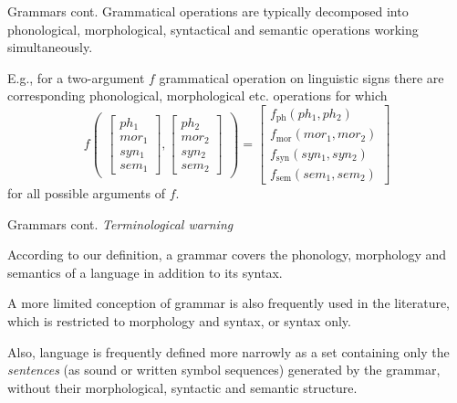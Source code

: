 \documentclass[style=upen, size=14pt]{powerdot}
\begin{document}
\begin{slide}[toc=]{Grammars cont.}
  Grammatical operations are typically decomposed into phonological,
  morphological, syntactical and semantic operations working simultaneously.
  
  E.g., for a two-argument $f$ grammatical operation on linguistic signs there are
  corresponding phonological, morphological etc. operations for which
  $$
  f
  \begin{pmatrix}
          \begin{bmatrix}
           ph_1 \\           
           mor_1 \\
           syn_1 \\
           sem_1
          \end{bmatrix},
          \begin{bmatrix}
           ph_2 \\           
           mor_2 \\
           syn_2 \\
           sem_2 
         \end{bmatrix}
       \end{pmatrix}
       =
       \begin{bmatrix}
           f_{\mathrm{ph}}(ph_1, ph_2)\\           
           f_{\mathrm{mor}}(mor_1, mor_2)\\
           f_{\mathrm{syn}}(syn_1, syn_2)\\
           f_{\mathrm{sem}}(sem_1, sem_2)
         \end{bmatrix}
         $$
  for all possible arguments of $f$.
\end{slide}

\begin{slide}[toc=]{Grammars cont.}
  \emph{Terminological warning}\bigskip
  
  According to our definition, a grammar covers the phonology, morphology and
  semantics of a language in addition to its syntax. \bigskip
  
  A more limited conception of grammar is also frequently used in the literature,
  which is restricted to morphology and syntax, or syntax only. \bigskip

  Also, language is frequently defined more narrowly as a set containing only
  the \emph{sentences} (as sound or written symbol sequences) generated by the
  grammar, without their morphological, syntactic and semantic structure.
\end{slide}
\end{document}
